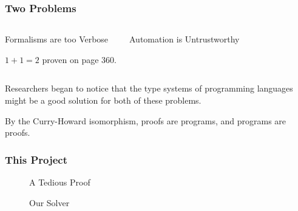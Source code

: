 \documentclass[usenames,dvipsnames]{beamer}
\begin{document}
\begin{frame}
  \frametitle{Two Problems}
  \begin{columns}[t]
    \begin{block}{Formalisms are too Verbose}

      \(1+1=2\) proven on page 360.
    \end{block}
    \begin{block}{Automation is Untrustworthy}
    \end{block}
  \end{columns}
  \vfill
  Researchers began to notice that the type systems of programming languages
  might be a good solution for both of these problems.

  By the Curry-Howard isomorphism, proofs are programs, and programs are proofs.
\end{frame}
\begin{frame}[fragile]
  \frametitle{This Project}
  \begin{figure}[t]
    \vspace{-10pt}
  \end{figure}

  \begin{minipage}[b]{0.5\textwidth}
    \begin{figure}[h!]
      \hspace*{-80pt}
      \caption{A Tedious Proof}
    \end{figure}%
  \end{minipage}%
  \begin{minipage}[b]{0.5\textwidth}
  \begin{figure}[h]
    \caption{Our Solver}
  \end{figure}
  \end{minipage}
\end{frame}
\end{document}
